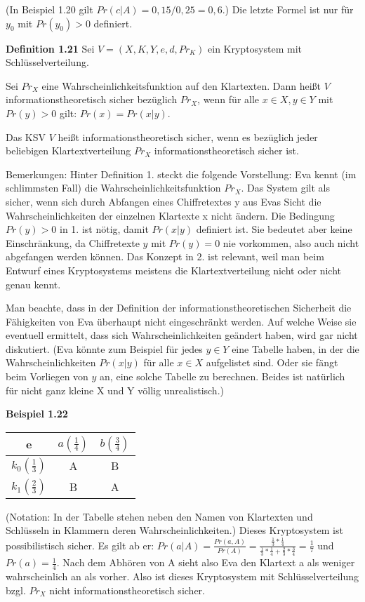 \documentclass[a4paper]{article}
\begin{document}
\begin{multicols}{3}
    (In Beispiel 1.20 gilt $Pr(c|A)=0,15/0,25=0,6$.) Die letzte Formel ist nur für $y_0$ mit $Pr(y_0)>0$ definiert.

    \textbf{Definition 1.21} Sei $V=(X,K,Y,e,d,Pr_K)$ ein Kryptosystem mit Schlüsselverteilung.
    \begin{enumerate*}
        \item Sei $Pr_X$ eine Wahrscheinlichkeitsfunktion auf den Klartexten. Dann heißt $V$ informationstheoretisch sicher bezüglich $Pr_X$, wenn für alle $x\in X,y\in Y$ mit $Pr(y)>0$ gilt: $Pr(x) = Pr(x|y)$.
        \item Das KSV $V$ heißt informationstheoretisch sicher, wenn es bezüglich jeder beliebigen Klartextverteilung $Pr_X$ informationstheoretisch sicher ist.
    \end{enumerate*}

    Bemerkungen: Hinter Definition 1. steckt die folgende Vorstellung: Eva kennt (im schlimmsten Fall) die Wahrscheinlichkeitsfunktion $Pr_X$. Das System gilt als sicher, wenn sich durch Abfangen eines Chiffretextes y aus Evas Sicht die Wahrscheinlichkeiten der einzelnen Klartexte x nicht ändern. Die Bedingung $Pr(y)>0$ in 1. ist nötig, damit $Pr(x|y)$ definiert ist. Sie bedeutet aber keine Einschränkung, da Chiffretexte $y$ mit $Pr(y)=0$ nie vorkommen, also auch nicht abgefangen werden können. Das Konzept in 2. ist relevant, weil man beim Entwurf eines Kryptosystems meistens die Klartextverteilung nicht oder nicht genau kennt.

    Man beachte, dass in der Definition der informationstheoretischen Sicherheit die Fähigkeiten von Eva überhaupt nicht eingeschränkt werden. Auf welche Weise sie eventuell ermittelt, dass sich Wahrscheinlichkeiten geändert haben, wird gar nicht diskutiert. (Eva könnte zum Beispiel für jedes $y\in Y$ eine Tabelle haben, in der die Wahrscheinlichkeiten $Pr(x|y)$ für alle $x\in X$ aufgelistet sind. Oder sie fängt beim Vorliegen von $y$ an, eine solche Tabelle zu berechnen. Beides ist natürlich für nicht ganz kleine X und Y völlig unrealistisch.)

    \textbf{Beispiel 1.22}
    \begin{tabular}{c|c|c}
    e         & $a(\frac{1}{4})$& $b(\frac{3}{4})$ \\\hline
    $k_0(\frac{1}{3})$ & A        & B        \\
    $k_1(\frac{2}{3})$ & B        & A        
    \end{tabular}

    (Notation: In der Tabelle stehen neben den Namen von Klartexten und Schlüsseln in Klammern deren Wahrscheinlichkeiten.) Dieses Kryptosystem ist possibilistisch sicher. Es gilt ab er:
    $Pr(a|A)=\frac{Pr(a,A)}{Pr(A)}=\frac{\frac{1}{3}*\frac{1}{4}}{\frac{1}{3}*\frac{1}{4}+\frac{2}{3}*\frac{3}{4}}=\frac{1}{7}$ und $Pr(a)=\frac{1}{4}$.
    Nach dem Abhören von A sieht also Eva den Klartext a als weniger wahrscheinlich an als vorher. Also ist dieses Kryptosystem mit Schlüsselverteilung bzgl. $Pr_X$ nicht informationstheoretisch sicher.


\end{multicols}
\end{document}

